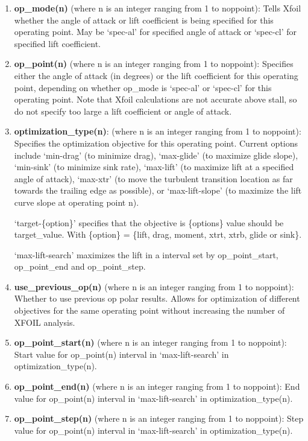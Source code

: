 \documentclass[11pt]{article}
\begin{document}
\begin{enumerate}
\item{\textbf{op\_mode(n)} (where n is an integer ranging from 1 to noppoint): Tells
	Xfoil whether the angle of attack or lift coefficient is being specified for this
	operating point.  May be `spec-al' for specified angle of attack or `spec-cl' for
	specified lift coefficient.}
\item{\textbf{op\_point(n)} (where n is an integer ranging from 1 to noppoint):
	Specifies either the angle of attack (in degrees) or the lift coefficient for this
	operating point, depending on whether op\_mode is `spec-al' or `spec-cl' for this
	operating point.  Note that Xfoil calculations are not accurate above stall, so do not
	specify too large a lift coefficient or angle of attack.}
\item{\textbf{optimization\_type(n)}: (where n is an integer ranging from 1 to
	noppoint): Specifies the optimization objective for this operating point. Current options 
	include `min-drag' (to minimize drag), `max-glide' (to maximize 
	glide slope), `min-sink' (to minimize sink rate), `max-lift' (to maximize lift at a
	specified angle of attack), `max-xtr' (to move the turbulent transition location as far
	towards the trailing edge as possible), or `max-lift-slope' (to maximize the lift curve
	slope at operating point n).
	
	`target-\{option\}' specifies that the objective is \{options\} value should be target\_value. 
	With \{option\} = \{lift, drag, moment, xtrt, xtrb, glide or sink\}.
	
	`max-lift-search' maximizes the lift in a interval set by op\_point\_start, op\_point\_end and op\_point\_step.}
\item{\textbf{use\_previous\_op(n)} (where n is an integer ranging from 1 to noppoint): Whether to use previous op polar results.
	Allows for optimization of different objectives for the same operating point without increasing the number of XFOIL analysis.}

\item{\textbf{op\_point\_start(n)} (where n is an integer ranging from 1 to noppoint): Start value for op\_point(n) interval in `max-lift-search' in optimization\_type(n).}

\item{\textbf{op\_point\_end(n)} (where n is an integer ranging from 1 to noppoint): End value for op\_point(n) interval in `max-lift-search' in optimization\_type(n).}

\item{\textbf{op\_point\_step(n)} (where n is an integer ranging from 1 to noppoint): Step value for op\_point(n) interval in `max-lift-search' in optimization\_type(n).}


\end{enumerate}
\end{document}
